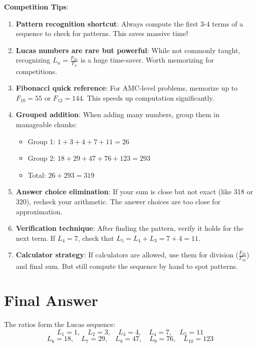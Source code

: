 \documentclass[12pt]{article}
\begin{document}
\begin{tipbox}
\textbf{Competition Tips}:

\begin{enumerate}
    \item \textbf{Pattern recognition shortcut}: Always compute the first 3-4 terms of a sequence to check for patterns. This saves massive time!
    
    \item \textbf{Lucas numbers are rare but powerful}: While not commonly taught, recognizing $L_n = \frac{F_{2n}}{F_n}$ is a huge time-saver. Worth memorizing for competitions.
    
    \item \textbf{Fibonacci quick reference}: For AMC-level problems, memorize up to $F_{10} = 55$ or $F_{12} = 144$. This speeds up computation significantly.
    
    \item \textbf{Grouped addition}: When adding many numbers, group them in manageable chunks:
    \begin{itemize}
        \item Group 1: $1 + 3 + 4 + 7 + 11 = 26$
        \item Group 2: $18 + 29 + 47 + 76 + 123 = 293$
        \item Total: $26 + 293 = 319$
    \end{itemize}
    
    \item \textbf{Answer choice elimination}: If your sum is close but not exact (like 318 or 320), recheck your arithmetic. The answer choices are too close for approximation.
    
    \item \textbf{Verification technique}: After finding the pattern, verify it holds for the next term. If $L_4 = 7$, check that $L_5 = L_4 + L_3 = 7 + 4 = 11$.
    
    \item \textbf{Calculator strategy}: If calculators are allowed, use them for division ($\frac{F_{20}}{F_{10}}$) and final sum. But still compute the sequence by hand to spot patterns.
\end{enumerate}
\end{tipbox}

\section*{Final Answer}

The ratios form the Lucas sequence:
$$L_1 = 1, \quad L_2 = 3, \quad L_3 = 4, \quad L_4 = 7, \quad L_5 = 11$$
$$L_6 = 18, \quad L_7 = 29, \quad L_8 = 47, \quad L_9 = 76, \quad L_{10} = 123$$
\end{document}
